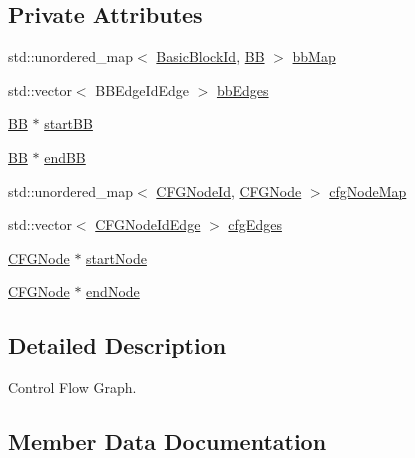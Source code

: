 \subsection*{Private Attributes}
\begin{DoxyCompactItemize}
\item 
std\+::unordered\+\_\+map$<$ \hyperlink{namespacespan_ab988dafbd25ab39838239b91d6a86214}{Basic\+Block\+Id}, \hyperlink{classspan_1_1ir_1_1obj_1_1BB}{BB} $>$ \hyperlink{classspan_1_1ir_1_1obj_1_1CFG_ab397d5c00efd9dd6a2ffeb545c16b71b}{bb\+Map}
\item 
std\+::vector$<$ B\+B\+Edge\+Id\+Edge $>$ \hyperlink{classspan_1_1ir_1_1obj_1_1CFG_a2480bf75b73356170ebb4578d4245f33}{bb\+Edges}
\item 
\hyperlink{classspan_1_1ir_1_1obj_1_1BB}{BB} $\ast$ \hyperlink{classspan_1_1ir_1_1obj_1_1CFG_a2a13f446a8367c04a854848ca378d2a3}{start\+BB}
\item 
\hyperlink{classspan_1_1ir_1_1obj_1_1BB}{BB} $\ast$ \hyperlink{classspan_1_1ir_1_1obj_1_1CFG_a7e5b207c46341e1635e9a98bc4b08163}{end\+BB}
\item 
std\+::unordered\+\_\+map$<$ \hyperlink{namespacespan_a34e8d849ca2007fe03cb1817685d08bf}{C\+F\+G\+Node\+Id}, \hyperlink{classspan_1_1ir_1_1obj_1_1CFGNode}{C\+F\+G\+Node} $>$ \hyperlink{classspan_1_1ir_1_1obj_1_1CFG_af11c6fd7a30810fbd49d9162a6b1d5da}{cfg\+Node\+Map}
\item 
std\+::vector$<$ \hyperlink{namespacespan_1_1ir_1_1obj_a8896662ab566cd79d401c0753d3c4120}{C\+F\+G\+Node\+Id\+Edge} $>$ \hyperlink{classspan_1_1ir_1_1obj_1_1CFG_a2352d9b13704a1074df3c8b1553a4c31}{cfg\+Edges}
\item 
\hyperlink{classspan_1_1ir_1_1obj_1_1CFGNode}{C\+F\+G\+Node} $\ast$ \hyperlink{classspan_1_1ir_1_1obj_1_1CFG_a990fe73e4c7c5ea8c6fb563f694787fe}{start\+Node}
\item 
\hyperlink{classspan_1_1ir_1_1obj_1_1CFGNode}{C\+F\+G\+Node} $\ast$ \hyperlink{classspan_1_1ir_1_1obj_1_1CFG_ad6da10e59a29576d2842dbc3ce34cdeb}{end\+Node}
\end{DoxyCompactItemize}


\subsection{Detailed Description}
Control Flow Graph. 

\subsection{Member Data Documentation}
\mbox{\label{classspan_1_1ir_1_1obj_1_1CFG_a2480bf75b73356170ebb4578d4245f33}} 

